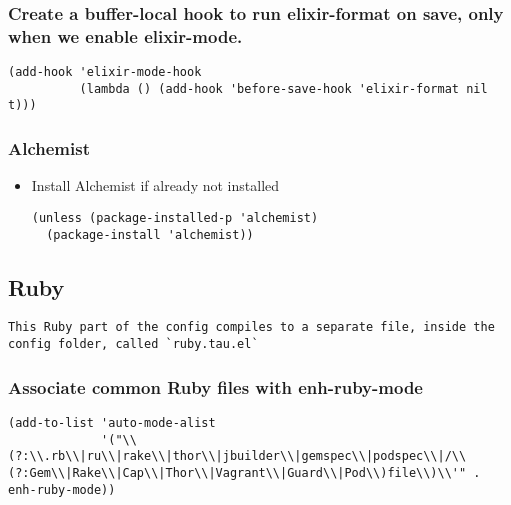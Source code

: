 \documentclass[11pt]{article}
\begin{document}
\subsubsection*{Create a buffer-local hook to run elixir-format on save, only when we enable elixir-mode.}
\label{sec:orgcce3a7b}

\begin{verbatim}
(add-hook 'elixir-mode-hook
          (lambda () (add-hook 'before-save-hook 'elixir-format nil t)))
\end{verbatim}


\subsubsection*{Alchemist}
\label{sec:orgf313a4e}

\begin{itemize}
\item Install Alchemist if already not installed
\label{sec:org9af99af}
\begin{verbatim}
(unless (package-installed-p 'alchemist)
  (package-install 'alchemist)) 
\end{verbatim}
\end{itemize}

\subsection*{Ruby}
\label{sec:org95a1383}

\begin{verbatim}
This Ruby part of the config compiles to a separate file, inside the config folder, called `ruby.tau.el`
\end{verbatim}

\subsubsection*{Associate common Ruby files with  enh-ruby-mode}
\label{sec:orgbb02eea}
\begin{verbatim}
(add-to-list 'auto-mode-alist
             '("\\(?:\\.rb\\|ru\\|rake\\|thor\\|jbuilder\\|gemspec\\|podspec\\|/\\(?:Gem\\|Rake\\|Cap\\|Thor\\|Vagrant\\|Guard\\|Pod\\)file\\)\\'" . enh-ruby-mode))
\end{verbatim}
\end{document}

